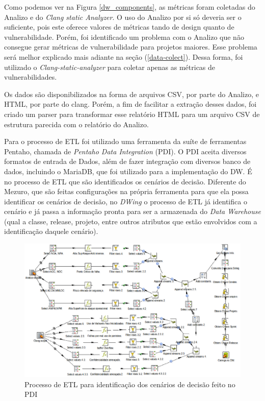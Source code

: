 Como podemos ver na Figura \ref{dw_components}, as métricas foram coletadas do Analizo e do \emph{Clang static Analyzer}. O uso do Analizo por si só deveria ser o suficiente, pois este oferece valores de métricas tando de design quanto de vulnerabilidade. Porém, foi identificado um problema com o Analizo que não consegue gerar métricas de vulnerabilidade para projetos maiores. Esse problema será melhor explicado mais adiante na seção (\ref{data-colect}). Dessa forma, foi utilizado o \emph{Clang-static-analyzer} para coletar apenas as métricas de vulnerabilidades.

%
Os dados são disponibilizados na forma de arquivos CSV, por parte do Analizo, e HTML, por parte do clang. Porém, a fim de facilitar a extração desses dados, foi criado um parser para transformar esse relatório HTML para um arquivo CSV de estrutura parecida com o relatório do Analizo.


Para o processo de ETL foi utilizado uma ferramenta da suíte de ferramentas Pentaho, chamada de \emph{Pentaho Data Integration} (PDI). O PDI aceita diversos formatos de entrada de Dados, além de fazer integração com diversos banco de dados, incluindo o MariaDB, que foi utilizado para a implementação do DW. É no processo de ETL que são identificados os cenários de decisão. Diferente do Mezuro, que são feitas configurações na própria ferramenta para que ela possa identificar os cenários de decisão, no \emph{DWing} o processo de ETL já identifica o cenário e já passa a informação pronta para ser a armazenada do \emph{Data Warehouse} (qual a classe, release, projeto, entre outros atributos que estão envolvidos com a identificação daquele cenário).


\begin{figure}[H]
 	\centering
 		\includegraphics[scale=0.5]{figuras/dw-etlpdi}
 		\caption{Processo de ETL para identificação dos cenários de decisão feito no PDI}
 		\label{dw-etl-pdi}
 \end{figure}

